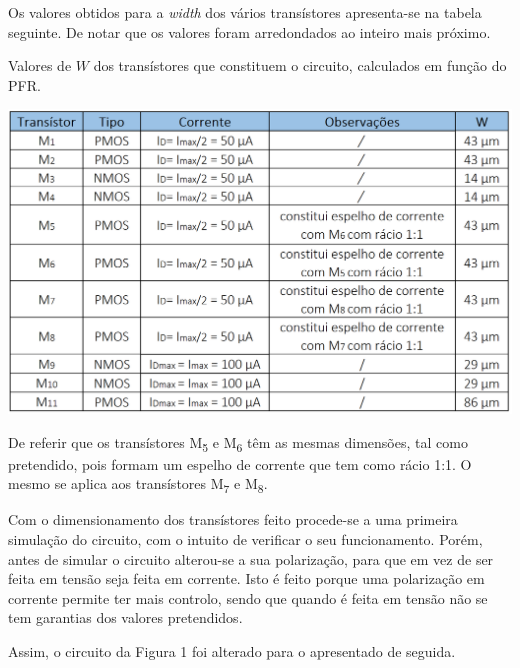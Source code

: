 \documentclass[11pt]{article}
\numberwithin{equation}{section}
\begin{document}
\vspace{1mm}
Os valores obtidos para a \textit{width} dos vários transístores apresenta-se na tabela seguinte. De notar que os valores foram arredondados ao inteiro mais próximo.

\begin{table}[H]
	\centering
	\caption{Valores de $W$ dos transístores que constituem o circuito, calculados em função do PFR.}
	\vspace{-1.5mm}
	\includegraphics[keepaspectratio=true, scale=0.45]{teoricas/valoresW2}
\end{table}

De referir que os transístores M\textsubscript{5} e M\textsubscript{6} têm as mesmas dimensões, tal como pretendido, pois formam um espelho de corrente que tem como rácio 1:1. O mesmo se aplica aos transístores M\textsubscript{7} e M\textsubscript{8}.

Com o dimensionamento dos transístores feito procede-se a uma primeira simulação do circuito, com o intuito de verificar o seu funcionamento. Porém, antes de simular o circuito alterou-se a sua polarização, para que em vez de ser feita em tensão seja feita em corrente. Isto é feito porque uma polarização em corrente permite ter mais controlo, sendo que quando é feita em tensão não se tem garantias dos valores pretendidos.  

Assim, o circuito da Figura 1 foi alterado para o apresentado de seguida.
\end{document}
